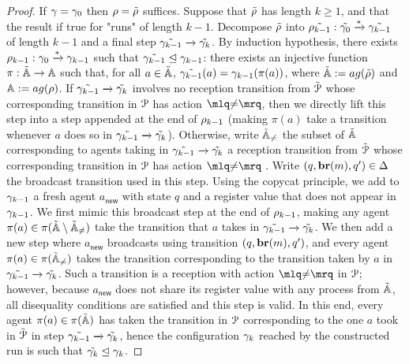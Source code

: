 \begin{proof}
	If $\gamma = \gamma_0$ then $\rho = \tilde{\rho}$ suffices. Suppose that $\tilde{\rho}$ has length $k \geq 1$, and that the result if true for "runs" of length $k-1$. Decompose $\tilde{\rho}$ into $\tilde{\rho_{k-1}}: \tilde{\gamma_0} \xrightarrow{*} \tilde{\gamma_{k-1}}$ of length $k-1$ and a final step $\tilde{\gamma_{k-1}} \xrightarrow{} \tilde{\gamma_k}$. 
	By induction hypothesis, there exists $\rho_{k-1}: \gamma_0 \xrightarrow{*} \gamma_{k-1}$ such that $\tilde{\gamma_{k-1}} \trianglelefteq \gamma_{k-1}$: there exists an injective function $\pi : \tilde{\mathbb{A}} \rightarrow \mathbb{A}$
	such that, for all $a \in \tilde{\mathbb{A}}$, $\tilde{\gamma_{k-1}}(a) = \gamma_{k-1}(\pi(a))$, where $\tilde{\agents} := \agentsof{\tilde{\run}}$ and $\agents := \agentsof{\run}$. If $\tilde{\gamma_{k-1}} \xrightarrow{} \tilde{\gamma_k}$ involves no reception transition from $\tilde{\mathcal{P}}$ whose corresponding transition in $\mathcal{P}$ has action $\quotemarks{\diseqtestact}$, then we directly lift this step into a step appended at the end of $\rho_{k-1}$ (making $\pi(a)$ take a transition whenever $a$ does so in $\tilde{\gamma_{k-1}} \xrightarrow{} \tilde{\gamma_k}$). Otherwise, write $\tilde{\mathbb{A}}_{{\ne}}$ the subset of $\tilde{\mathbb{A}}$ corresponding to agents taking in $\tilde{\gamma_{k-1}} \xrightarrow{} \tilde{\gamma_k}$ a reception transition from $\tilde{\mathcal{P}}$ whose corresponding transition in $\mathcal{P}$ has action $\quotemarks{\diseqtestact}$ . Write $(q, \textbf{br}(m), q') \in \Delta$ the broadcast transition used in this step.  Using the copycat principle, we add to $\gamma_{k-1}$ a fresh agent $a_{\mathsf{new}}$ with state $q$ and a register value that does not appear in $\gamma_{k-1}$. 
	We first mimic this broadcast step at the end of $\rho_{k-1}$, making any agent $\pi(a) \in \pi(\tilde{\mathbb{A}} \setminus \tilde{\mathbb{A}}_{{\ne}})$ take the transition that $a$ takes in $\tilde{\gamma_{k-1}} \xrightarrow{} \tilde{\gamma_k}$. We then add a new step where $a_{\mathsf{new}}$ broadcasts using transition $(q, \textbf{br}(m), q')$, and every agent $\pi(a) \in \pi(\tilde{\mathbb{A}}_{{\ne}})$ takes the transition corresponding to the transition taken by $a$ in $\tilde{\gamma_{k-1}} \xrightarrow{} \tilde{\gamma_k}$. Such a transition is a reception with action $\quotemarks{\diseqtestact}$ in $\mathcal{P}$; however, because $a_{\mathsf{new}}$ does not share its register value with any process from $\tilde{\mathbb{A}}$, all disequality conditions are satisfied and this step is valid. In this end, every agent $\pi(a) \in \pi(\tilde{\mathbb{A}})$ has taken the transition in $\mathcal{P}$ corresponding to the one $a$ took in $\tilde{\mathcal{P}}$ in step $\tilde{\gamma_{k-1}} \xrightarrow{} \tilde{\gamma_k}$, hence the configuration $\gamma_k$ reached by the constructed run is such that $\tilde{\gamma_k} \trianglelefteq \gamma_k$. 
\end{proof}

